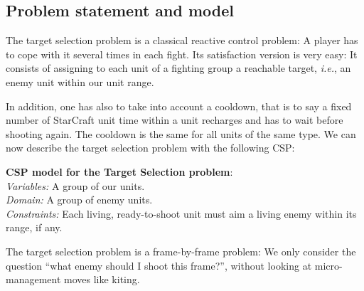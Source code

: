 \documentclass{article}
\newcommand{\csp}{\textsc{CSP}\xspace}
\newcommand{\ie}{\textit{i.e.}}
\newcommand{\modelcsp}[4]%
{ \begin{trivlist}
  \item[]%
    \textbf{CSP model for #1}:\\
    \textit{Variables:} #2\\
    \textit{Domain:} #3\\
    \textit{Constraints:} #4
  \end{trivlist}%
}
\begin{document}
\subsection{Problem statement and model}

The target selection problem is  a classical reactive control problem:
A  player has  to  cope with  it  several times  in  each fight.   Its
satisfaction version  is very easy:  It consists of assigning  to each
unit of a fighting group a reachable target, \ie, an enemy unit within
our unit range.

In addition, one has also to take  into account a cooldown, that is to
say a fixed number of StarCraft  unit time within a unit recharges and
has to wait  before shooting again.  The cooldown is  the same for all
units of  the same  type.  We  can now  describe the  target selection
problem with the following \csp:
\modelcsp{the Target Selection problem}%
{A group of our units.}%
{A group of enemy units.}%
{Each living, ready-to-shoot  unit must aim a living  enemy within its
  range, if any.}

The  target selection  problem is  a frame-by-frame  problem: We  only
consider  the question  ``what  enemy should  I  shoot this  frame?'',
without looking at micro-management moves like kiting.
\end{document}
